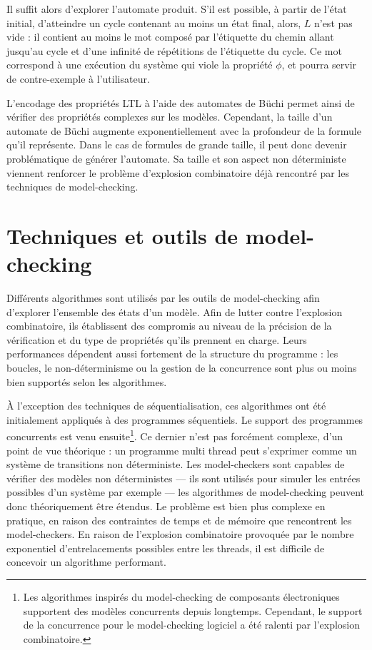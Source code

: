 Il suffit alors d'explorer l'automate produit. S’il est possible, à partir
de l'état initial, d'atteindre un cycle contenant au moins un état final, alors,
\(L\) n'est pas vide : il contient au moins le mot composé par l'étiquette du
chemin allant jusqu'au cycle et d'une infinité de répétitions de l'étiquette du
cycle. Ce mot correspond à une exécution du système qui viole la propriété \(\phi\),
et pourra servir de contre-exemple à l'utilisateur.

L'encodage des propriétés \ac{LTL} à l'aide des automates de Büchi permet ainsi de
vérifier des propriétés complexes sur les modèles. Cependant, la taille d'un
automate de Büchi augmente exponentiellement avec la profondeur de la formule
qu'il représente. Dans le cas de formules de grande taille, il peut donc devenir
problématique de générer l'automate. Sa taille et son aspect non déterministe
viennent renforcer le problème d'explosion combinatoire déjà rencontré par les
techniques de model-checking.

\section{Techniques et outils de model-checking}
\label{sec:techniques-et-outils-de-model-checking}

Différents algorithmes sont utilisés par les outils de model-checking
afin d'explorer l'ensemble des états d'un modèle. Afin de lutter contre
l'explosion combinatoire, ils établissent des compromis au niveau de la
précision de la vérification et du type de propriétés qu'ils prennent en charge.
Leurs performances dépendent aussi fortement de la
structure du programme : les boucles, le non-déterminisme ou la gestion
de la concurrence sont plus ou moins bien supportés selon
les algorithmes.

À l'exception des techniques de séquentialisation, ces algorithmes ont été
initialement appliqués à des programmes séquentiels. Le support des programmes
concurrents est venu ensuite\footnote{Les algorithmes inspirés du model-checking
  de composants électroniques supportent des modèles concurrents depuis
  longtemps. Cependant, le support de la concurrence pour le model-checking
  logiciel a été ralenti par l'explosion combinatoire.}.
Ce dernier n'est pas forcément complexe, d'un point de vue théorique : un
programme multi thread peut s'exprimer comme un système de transitions
non déterministe. Les model-checkers sont capables de vérifier des modèles
non déterministes --- ils sont utilisés pour simuler les entrées possibles d'un
système par exemple --- les algorithmes de model-checking peuvent donc
théoriquement être étendus.
Le problème est bien plus complexe en pratique, en raison des contraintes de
temps et de mémoire que rencontrent les model-checkers. En raison de l'explosion
combinatoire provoquée par le nombre exponentiel d'entrelacements possibles
entre les threads, il est difficile de concevoir un algorithme performant.


